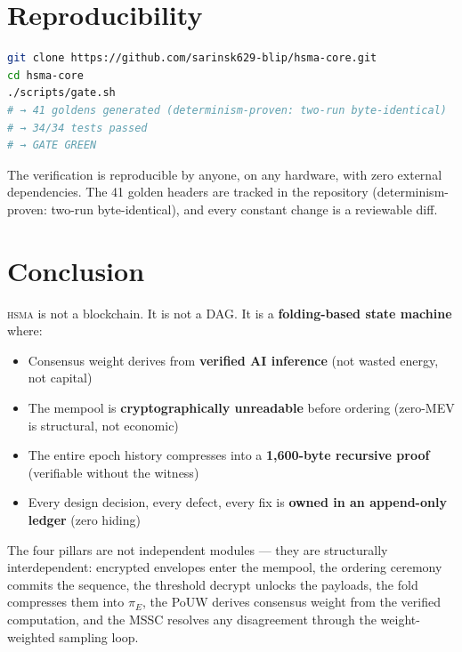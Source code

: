 \documentclass[11pt, a4paper]{article}
\newcommand{\hsma}{\textsc{hsma}}
\begin{document}
\section{Reproducibility}

\begin{lstlisting}[language=bash]
git clone https://github.com/sarinsk629-blip/hsma-core.git
cd hsma-core
./scripts/gate.sh
# → 41 goldens generated (determinism-proven: two-run byte-identical)
# → 34/34 tests passed
# → GATE GREEN
\end{lstlisting}

The verification is reproducible by anyone, on any hardware, with zero external dependencies. The 41 golden headers are tracked in the repository (determinism-proven: two-run byte-identical), and every constant change is a reviewable diff.

\section{Conclusion}

\hsma{} is not a blockchain. It is not a DAG. It is a \textbf{folding-based state machine} where:

\begin{itemize}
\item Consensus weight derives from \textbf{verified AI inference} (not wasted energy, not capital)
\item The mempool is \textbf{cryptographically unreadable} before ordering (zero-MEV is structural, not economic)
\item The entire epoch history compresses into a \textbf{1,600-byte recursive proof} (verifiable without the witness)
\item Every design decision, every defect, every fix is \textbf{owned in an append-only ledger} (zero hiding)
\end{itemize}

The four pillars are not independent modules --- they are structurally interdependent: encrypted envelopes enter the mempool, the ordering ceremony commits the sequence, the threshold decrypt unlocks the payloads, the fold compresses them into $\pi_E$, the PoUW derives consensus weight from the verified computation, and the MSSC resolves any disagreement through the weight-weighted sampling loop.
\end{document}
